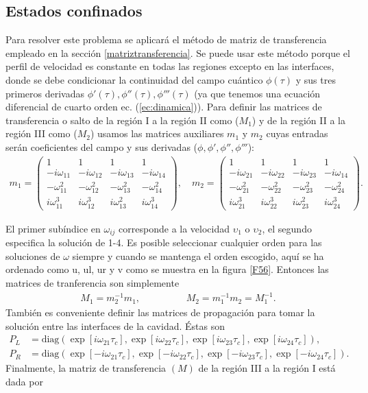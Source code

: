 \subsection{Estados confinados}
Para resolver este problema se aplicar\'{a} el método de matriz de transferencia empleado en la secci\'{o}n \ref{matriztransferencia}. Se puede usar este método porque el perfil de velocidad es constante en todas las regiones excepto en las interfaces, donde se debe condicionar la continuidad del campo cuántico $\phi(\tau)$ y sus tres primeros derivadas $\phi'(\tau), \phi''(\tau),\phi'''(\tau)$ (ya que tenemos una ecuación diferencial de cuarto orden ec. (\ref{ec:dinamica})).
Para definir las matrices de transferencia o salto de la región I a la regi\'{o}n II como ($M_1$) y de la regi\'{o}n II a la regi\'{o}n III como ($M_2$) usamos las matrices auxiliares $m_1$ y $m_2$  cuyas entradas ser\'{a}n coeficientes del campo y sus derivadas ($\phi,\phi', \phi'',\phi'''$):
\begin{eqnarray*}
m_1=\begin{pmatrix}
1 & 1 & 1 & 1 \\ 
-i\omega_{11} &-i\omega_{12}  & -i\omega_{13} &-i\omega_{14} \\ 
-\omega_{11}^2 &- \omega_{12}^2 &-\omega_{13}^2  &-\omega_{14}^2 \\ 
 i\omega_{11}^3&  i\omega_{12}^3&  i\omega_{13}^2 & i\omega_{14}^3
\end{pmatrix},\quad m_2=\begin{pmatrix}
1 & 1 & 1 & 1 \\ 
-i\omega_{21} &-i\omega_{22}  & -i\omega_{23} &-i\omega_{14} \\ 
-\omega_{21}^2 &- \omega_{22}^2 &-\omega_{23}^2  &-\omega_{24}^2 \\ 
 i\omega_{21}^3&  i\omega_{22}^3&  i\omega_{23}^2 & i\omega_{24}^3
\end{pmatrix}.
\end{eqnarray*} 

El primer sub\'{i}ndice en $\omega_{ij}$ corresponde a la velocidad $\upsilon_1$ o $\upsilon_2$, el segundo especifica la soluci\'{o}n de 1-4. Es posible seleccionar cualquier orden para las soluciones de $\omega$ siempre y cuando se mantenga el orden escogido, aqu\'{i} se ha ordenado como u, ul, ur y v como se muestra en la figura \ref{F56}. Entonces las matrices de tranferencia son simplemente 
\begin{align}
M_1=m_2^{-1} m_1, \hspace{2cm}M_2=m_1^{-1} m_2=M_1^{-1}.
\end{align}
También es conveniente definir las matrices de propagación para tomar la solución entre las interfaces de la cavidad.
\'{E}stas son
\begin{align}
 P_L&=\text{diag}(\exp[i\omega_{21}\tau_c],\exp[i\omega_{22}\tau_c],\exp[i\omega_{23}\tau_c],\exp[i\omega_{24}\tau_c]),\\
P_R&=\text{diag}(\exp[-i\omega_{21}\tau_c],\exp[-i\omega_{22}\tau_c],\exp[-i\omega_{23}\tau_c],\exp[-i\omega_{24}\tau_c]).
\end{align}
Finalmente, la matriz de transferencia $(M)$ de la regi\'{o}n III a la regi\'{o}n I est\'{a} dada por

